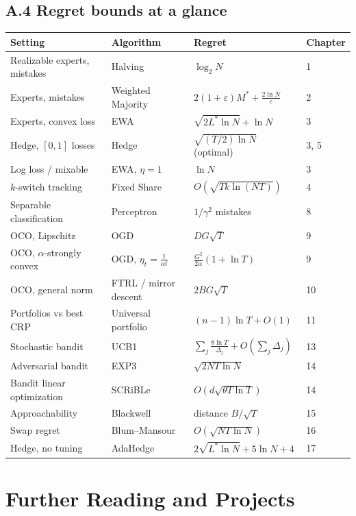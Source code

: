 \documentclass[11pt,a4paper,openany]{book}
\newcommand{\eps}{\varepsilon}
\begin{document}
\section*{A.4 Regret bounds at a glance}\label{appA-cheat}

\begin{center}\small
\begin{tabularx}{\linewidth}{YYYl}
\toprule
\textbf{Setting} & \textbf{Algorithm} & \textbf{Regret} & \textbf{Chapter} \\
\midrule
Realizable experts, mistakes & Halving & $\log_2N$ & 1 \\
Experts, mistakes & Weighted Majority & $2(1+\eps)M^*+\frac{2\ln N}\eps$ & 2 \\
Experts, convex loss & EWA & $\sqrt{2L^*\ln N}+\ln N$ & 3 \\
Hedge, $[0,1]$ losses & Hedge & $\sqrt{(T/2)\ln N}$ (optimal) & 3, 5 \\
Log loss / mixable & EWA, $\eta=1$ & $\ln N$ & 3 \\
$k$-switch tracking & Fixed Share & $O(\sqrt{Tk\ln(NT)})$ & 4 \\
Separable classification & Perceptron & $1/\gamma^2$ mistakes & 8 \\
OCO, Lipschitz & OGD & $DG\sqrt T$ & 9 \\
OCO, $\alpha$-strongly convex & OGD, $\eta_t=\frac1{\alpha t}$ & $\frac{G^2}{2\alpha}(1+\ln T)$ & 9 \\
OCO, general norm & FTRL / mirror descent & $2BG\sqrt T$ & 10 \\
Portfolios vs best CRP & Universal portfolio & $(n-1)\ln T+O(1)$ & 11 \\
Stochastic bandit & UCB1 & $\sum_j\frac{8\ln T}{\Delta_j}+O(\sum_j\Delta_j)$ & 13 \\
Adversarial bandit & EXP3 & $\sqrt{2NT\ln N}$ & 14 \\
Bandit linear optimization & SCRiBLe & $O(d\sqrt{\theta T\ln T})$ & 14 \\
Approachability & Blackwell & distance $B/\sqrt T$ & 15 \\
Swap regret & Blum–Mansour & $O(\sqrt{NT\ln N})$ & 16 \\
Hedge, no tuning & AdaHedge & $2\sqrt{L^*\ln N}+5\ln N+4$ & 17 \\
\bottomrule
\end{tabularx}
\end{center}

\chapter[Reading and projects]{Further Reading and Projects}\label{appB}
\end{document}
